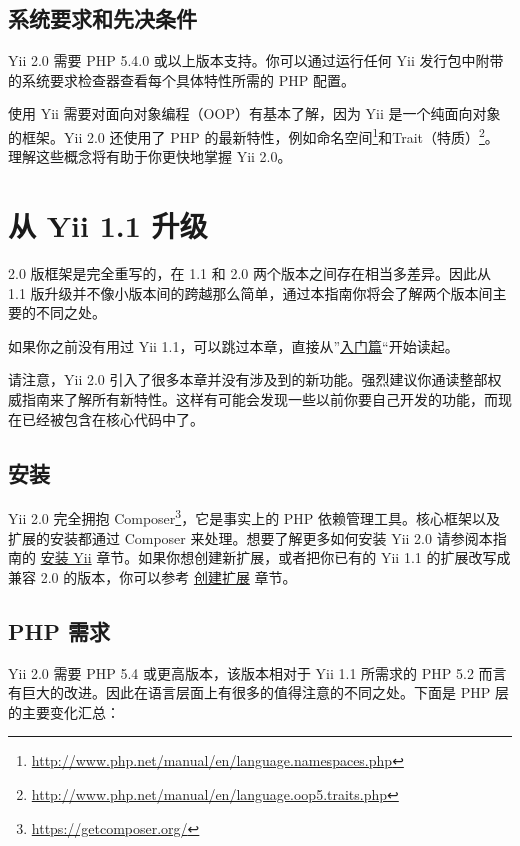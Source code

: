 \subsection{系统要求和先决条件}
Yii 2.0 需要 PHP 5.4.0 或以上版本支持。你可以通过运行任何 Yii 发行包中附带的系统要求检查器查看每个具体特性所需的 PHP 配置。

使用 Yii 需要对面向对象编程（OOP）有基本了解，因为 Yii 是一个纯面向对象的框架。Yii 2.0 还使用了 PHP 的最新特性，例如命名空间\footnote{\url{http://www.php.net/manual/en/language.namespaces.php}}和Trait（特质）\footnote{\url{http://www.php.net/manual/en/language.oop5.traits.php}}。理解这些概念将有助于你更快地掌握 Yii 2.0。



\label{intro-upgrade-from-v1.md}\section{从 Yii 1.1 升级}
2.0 版框架是完全重写的，在 1.1 和 2.0 两个版本之间存在相当多差异。因此从 1.1 版升级并不像小版本间的跨越那么简单，通过本指南你将会了解两个版本间主要的不同之处。

如果你之前没有用过 Yii 1.1，可以跳过本章，直接从''\hyperref[start-installation.md]{入门篇}``开始读起。

请注意，Yii 2.0 引入了很多本章并没有涉及到的新功能。强烈建议你通读整部权威指南来了解所有新特性。这样有可能会发现一些以前你要自己开发的功能，而现在已经被包含在核心代码中了。

\subsection{安装}
Yii 2.0 完全拥抱 Composer\footnote{\url{https://getcomposer.org/}}，它是事实上的 PHP 依赖管理工具。核心框架以及扩展的安装都通过 Composer 来处理。想要了解更多如何安装 Yii 2.0 请参阅本指南的 \hyperref[start-installation.md]{安装 Yii} 章节。如果你想创建新扩展，或者把你已有的 Yii 1.1 的扩展改写成兼容 2.0 的版本，你可以参考 \hyperref[structure-extensions.md::creating-extensions]{创建扩展} 章节。

\subsection{PHP 需求}
Yii 2.0 需要 PHP 5.4 或更高版本，该版本相对于 Yii 1.1 所需求的 PHP 5.2 而言有巨大的改进。因此在语言层面上有很多的值得注意的不同之处。下面是 PHP 层的主要变化汇总：

